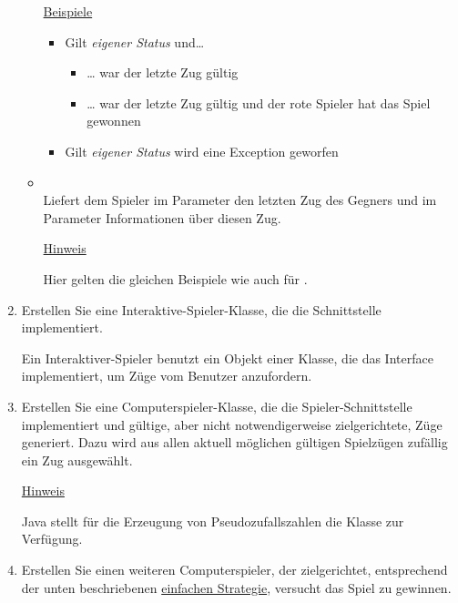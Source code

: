 \begin{enumerate}
\begin{itemize}[leftmargin=4em]
\underline{Beispiele}
\begin{itemize}
\item Gilt \textit{eigener Status} und\dots
\begin{itemize}
\item \dots {} war der letzte Zug gültig
\item \dots {} war der letzte Zug gültig und der rote Spieler hat das Spiel gewonnen
\end{itemize}
\item Gilt \textit{eigener Status} wird eine Exception geworfen
\end{itemize}
\item[\code{update}] \hfill \\Liefert dem Spieler im Parameter  den letzten Zug des Gegners und im Parameter  Informationen über diesen Zug.

\underline{Hinweis}

Hier gelten die gleichen Beispiele wie auch für .
\end{itemize}

\item Erstellen Sie eine Interaktive-Spieler-Klasse, die die Schnittstelle \\  implementiert.

Ein Interaktiver-Spieler benutzt ein Objekt einer Klasse, die das Interface \\  implementiert, um Züge vom Benutzer anzufordern.

\item Erstellen Sie eine Computerspieler-Klasse, die die Spieler-Schnittstelle implementiert und gültige, aber nicht notwendigerweise zielgerichtete, Züge generiert. Dazu wird aus allen aktuell möglichen gültigen Spielzügen zufällig ein Zug ausgewählt.

\underline{Hinweis}

Java stellt für die Erzeugung von Pseudozufallszahlen die Klasse  zur Verfügung.

\item Erstellen Sie einen weiteren Computerspieler, der zielgerichtet, entsprechend der unten beschriebenen \hyperlink{strategy}{einfachen Strategie}, versucht das Spiel zu gewinnen.


\end{enumerate}
